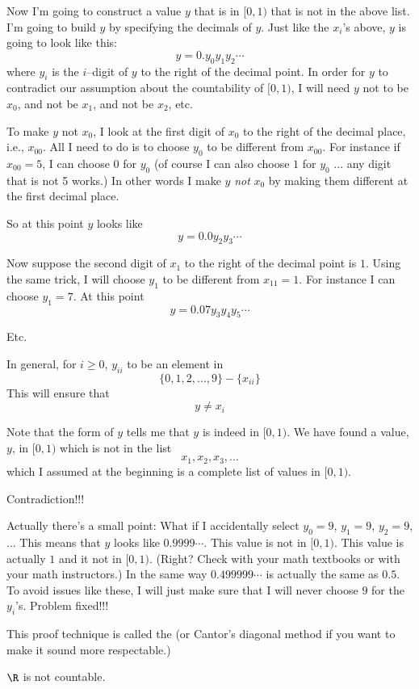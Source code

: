 Now I'm going to construct a value $y$ that is in $[0,1)$ that is
not in the above list.
I'm going to build $y$ by specifying the decimals of $y$.
Just like the $x_i$'s above, $y$ is going to look like this:
\[
y = 0.y_0 y_1 y_2 \cdots
\]
where $y_i$ is the $i$--digit of $y$ to the right of the decimal point.
In order for $y$ to contradict our assumption about 
the countability of $[0,1)$,
I will need $y$ not to be $x_0$, and not be $x_1$, and not be $x_2$, etc.

To make $y$ not $x_0$, I look at the first digit of $x_0$ to the right
of the decimal place, i.e., $x_{00}$.
All I need to do is to choose $y_0$ to be different from $x_{00}$.
For instance if $x_{00} = 5$, 
I can choose $0$ for $y_0$ (of course I can also choose $1$
for $y_0$ ... any digit that is not 5 works.)
In other words I make $y$ \textit{not} $x_0$ by making them different
at the first decimal place.

So at this point $y$ looks like
\[
y = 0.0y_2 y_3 \cdots
\]

Now suppose the second digit of $x_1$ to the right of the decimal point
is $1$.
Using the same trick, I will choose $y_1$ to be different from $x_{11} = 1$.
For instance I can choose $y_1 = 7$.
At this point
\[
y = 0.07 y_3 y_4 y_5 \cdots
\]

Etc.

In general, for $i \geq 0$, $y_{ii}$ to be an element in
\[
\{0, 1, 2, \ldots, 9\} - \{x_{ii}\}
\]
This will ensure that
\[
y \neq x_i
\]

Note that the form of $y$ tells me that $y$ is indeed in $[0,1)$.
We have found a value, $y$, in $[0,1)$ which is not in the list
\[
x_1, x_2, x_3, ...
\] 
which I assumed at the beginning is a complete list of values in $[0,1)$.

Contradiction!!!

Actually there's a small point:
What if I accidentally select $y_0 = 9$, $y_1 = 9$, $y_2 = 9$, ...
This means that $y$ looks like $0.9999\cdots$.
This value is not in $[0,1)$.
This value is actually $1$ and it not in $[0,1)$.
(Right? Check with your math textbooks or with your math instructors.)
In the same way $0.499999\cdots$ is actually the same as
$0.5$.
To avoid issues like these, I will just make sure that I will never choose
$9$ for the $y_i$'s.
Problem fixed!!!

This proof technique is called the 
(or Cantor's diagonal method if you want to make it sound more respectable.)

\begin{thm}
$\R$ is not countable.
\end{thm}

